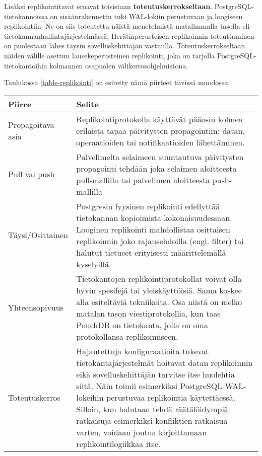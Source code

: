 \documentclass[finnish,twoside,censored,csm,sw-track-2018]{HYthesisML}
\begin{document}
Lisäksi replikointitavat eroavat toisistaan \textbf{toteutuskerrokseltaan}. PostgreSQL-tietokan\-noissa on sisäänrakennettu tuki WAL-lokiin perustuvaan ja loogiseen replikointiin. Ne on siis toteutettu näistä menetelmistä matalimmalla tasolla eli tietokannanhallintajärjestel\-mässä. Herätinperusteisen replikoinnin toteuttaminen on puolestaan lähes täysin sovelluskehittäjän vastuulla. Toteutuskerrokseltaan näiden välille asettuu lausekeperusteinen replikointi, joka on tarjolla PostgreSQL-tietokantoihin kolmannen osapuolen välikerrosohjelmistona.

Taulukossa \ref{table-replikointi} on esitetty nämä piirteet tiivissä muodossa:

\begin{center}
\begin{tabular}{ | m{3cm} | m{12cm} | } 
 \hline
 \textbf{Piirre} & \textbf{Selite}\\ 
 \hline
 Propagoitava asia & Replikointiprotokolla käyttävät pääosin kolmea erilaista tapaa päivitysten propagointiin: datan, operaatioiden tai notifikaatioiden lähettäminen. \\
 \hline
 Pull vai push & Palvelimelta selaimeen suuntautuva päivitysten propagointi tehdään joka selaimen aloitteesta pull-mallilla tai palvelimen aloitteesta push-mallilla \\
 \hline
 Täysi/Osittainen & Postgresin fyysinen replikointi edellyttää tietokannan kopioimista kokonaisuudessaan. Looginen replikointi mahdollistaa osittaisen replikoinnin joko rajausehdoilla (engl. filter) tai halutut tietueet erityisesti määrittelemällä kyselyillä.\\
 \hline
 Yhteensopivuus & Tietokantojen replikointiprotokollat voivat olla hyvin spesifejä tai yleiskäyttöisiä. Sama koskee alla esiteltäviä tekniikoita. Osa niistä on melko matalan tason viestiprotokollia, kun taas PouchDB on tietokanta, jolla on oma protokollansa replikoimiseen.\\
 \hline
 Toteutuskerros & Hajautettuja konfiguraatioita tukevat tietokantajärjestelmät hoitavat datan replikoinnin eikä sovelluskehittäjän tarvitse itse huolehtia siitä. Näin toimii esimerkiksi PostgreSQL WAL-lokeihin perustuvaa replikointia käytettäessä. Silloin, kun halutaan tehdä räätälöidympiä ratkaisuja esimerkiksi konfliktien ratkaisua varten, voidaan joutua kirjoittamaan replikointilogiikkaa itse.\\
 \hline
\end{tabular}
\label{table-replikointi}
\end{center}
\end{document}
